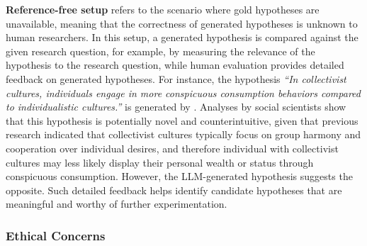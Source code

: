     \textbf{Reference-free setup} refers to the scenario where gold hypotheses are unavailable, meaning that the correctness of generated hypotheses is unknown to human researchers. In this setup, a generated hypothesis is compared against the given research question, for example, by measuring the relevance of the hypothesis to the research question, while human evaluation provides detailed feedback on generated hypotheses. For instance, the hypothesis \textit{``In collectivist cultures, individuals engage in more conspicuous consumption behaviors compared to individualistic cultures.''} is generated by \citet{yang2023large}. Analyses by social scientists show that this hypothesis is potentially novel and counterintuitive, given that previous research indicated that collectivist cultures typically focus on group harmony and cooperation over individual desires, and therefore  individual with collectivist cultures  may less likely display their personal wealth or status through conspicuous consumption. However, the LLM-generated hypothesis suggests the opposite. Such detailed feedback helps identify candidate hypotheses that are meaningful and worthy of further experimentation.
    \fi
    

\subsubsection{Ethical Concerns}

